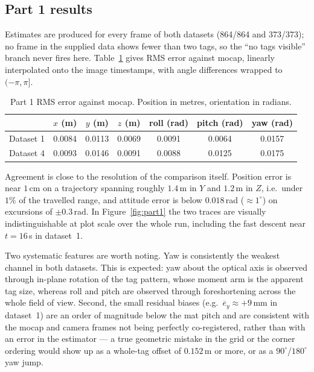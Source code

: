 \documentclass[10pt]{article}
\begin{document}
\subsection{Part 1 results}

Estimates are produced for every frame of both datasets (864/864 and 373/373); no frame in the
supplied data shows fewer than two tags, so the ``no tags visible'' branch never fires here.
Table~\ref{tab:pose} gives RMS error against mocap, linearly interpolated onto the image timestamps,
with angle differences wrapped to $(-\pi,\pi]$.

\begin{table}[htbp]
\centering\small
\caption{Part 1 RMS error against mocap. Position in metres, orientation in radians.}
\label{tab:pose}
\begin{tabular}{lcccccc}
\toprule
& $x$ (m) & $y$ (m) & $z$ (m) & roll (rad) & pitch (rad) & yaw (rad) \\
\midrule
Dataset 1 & 0.0084 & 0.0113 & 0.0069 & 0.0091 & 0.0064 & 0.0157 \\
Dataset 4 & 0.0093 & 0.0146 & 0.0091 & 0.0088 & 0.0125 & 0.0175 \\
\bottomrule
\end{tabular}
\end{table}

Agreement is close to the resolution of the comparison itself. Position error is near $1\,$cm on a
trajectory spanning roughly $1.4\,$m in $Y$ and $1.2\,$m in $Z$, i.e.\ under $1\%$ of the travelled
range, and attitude error is below $0.018\,$rad ($\approx1^\circ$) on excursions of
$\pm0.3\,$rad. In Figure~\ref{fig:part1} the two traces are visually indistinguishable at plot
scale over the whole run, including the fast descent near $t=16\,$s in dataset~1.

Two systematic features are worth noting. Yaw is consistently the weakest channel in both datasets.
This is expected: yaw about the optical axis is observed through in-plane rotation of the tag
pattern, whose moment arm is the apparent tag size, whereas roll and pitch are observed through
foreshortening across the whole field of view. Second, the small residual biases (e.g.\
$\overline{e}_y \approx +9\,$mm in dataset~1) are an order of magnitude below the mat pitch and are
consistent with the mocap and camera frames not being perfectly co-registered, rather than with an
error in the estimator --- a true geometric mistake in the grid or the corner ordering would show up
as a whole-tag offset of $0.152\,$m or more, or as a $90^\circ$/$180^\circ$ yaw jump.
\end{document}
